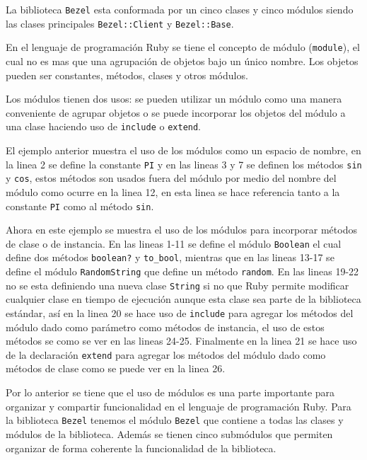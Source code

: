 La biblioteca \texttt{Bezel} esta conformada por un cinco clases y cinco módulos
siendo las clases principales \texttt{Bezel::Client} y \texttt{Bezel::Base}.

En el lenguaje de programación Ruby se tiene el concepto de módulo (\texttt{module}),
el cual no es mas que una agrupación de objetos bajo un único nombre. Los objetos
pueden ser constantes, métodos, clases y otros módulos.

Los módulos tienen dos usos: se pueden utilizar un módulo como una manera conveniente
de agrupar objetos o se puede incorporar los objetos del módulo a una clase haciendo
uso de \texttt{include} o \texttt{extend}.



El ejemplo anterior muestra el uso de los módulos como un espacio de nombre,
en la linea 2 se define la constante \texttt{PI} y en las lineas 3 y 7 se definen
los métodos \texttt{sin} y \texttt{cos}, estos métodos son usados fuera del
módulo por medio del nombre del módulo como ocurre en la linea 12, en esta
linea se hace referencia tanto a la constante \texttt{PI} como al método
\texttt{sin}.



Ahora en este ejemplo se muestra el uso de los módulos para incorporar métodos
de clase o de instancia. En las lineas 1-11 se define el módulo \texttt{Boolean}
el cual define dos métodos \texttt{boolean?} y \texttt{to\_bool}, mientras que
en las lineas 13-17 se define el módulo \texttt{RandomString} que define un método
\texttt{random}. En las lineas 19-22 no se esta definiendo una nueva clase
\texttt{String} si no que Ruby permite modificar cualquier clase en tiempo de
ejecución aunque esta clase sea parte de la biblioteca estándar, así en la linea 20
se hace uso de \texttt{include} para agregar los métodos del módulo dado como
parámetro como métodos de instancia, el uso de estos métodos se como se ver en las
lineas 24-25. Finalmente en la linea 21 se hace uso de la declaración \texttt{extend}
para agregar los métodos del módulo dado como métodos de clase como se puede
ver en la linea 26.

Por lo anterior se tiene que el uso de módulos es una parte importante para
organizar y compartir funcionalidad en el lenguaje de programación Ruby.
Para la biblioteca \texttt{Bezel} tenemos el módulo \texttt{Bezel} que contiene
a todas las clases y módulos de la biblioteca. Además se tienen cinco submódulos
que permiten organizar de forma coherente la funcionalidad de la biblioteca.

